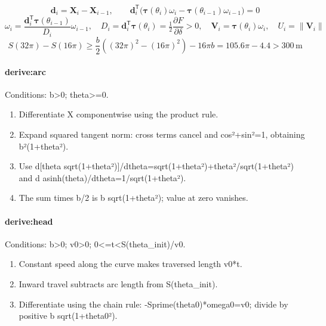 \begin{equation}
\mathbf d_i=\mathbf X_i-\mathbf X_{i-1},\qquad \mathbf d_i^{\mathsf T}\bigl(\boldsymbol\tau(\theta_i)\omega_i-\boldsymbol\tau(\theta_{i-1})\omega_{i-1}\bigr)=0
\label{eq:velocity-constraint}
\end{equation}
\begin{equation}
\boxed{\omega_i=\frac{\mathbf d_i^{\mathsf T}\boldsymbol\tau(\theta_{i-1})}{D_i}\omega_{i-1}},\quad D_i=\mathbf d_i^{\mathsf T}\boldsymbol\tau(\theta_i)=\tfrac12\frac{\partial F}{\partial\delta}>0,\quad \mathbf V_i=\boldsymbol\tau(\theta_i)\omega_i,\quad U_i=\|\mathbf V_i\|
\label{eq:velocity}
\end{equation}
\begin{equation}
S(32\pi)-S(16\pi)\ge\frac b2\left((32\pi)^2-(16\pi)^2\right)-16\pi b=105.6\pi-4.4>300\,\mathrm m
\label{eq:radius-bound}
\end{equation}
\paragraph{derive:arc}
Conditions: b>0; theta>=0.
\begin{enumerate}
\item Differentiate X componentwise using the product rule.
\item Expand squared tangent norm: cross terms cancel and cos²+sin²=1, obtaining b²(1+theta²).
\item Use d[theta sqrt(1+theta²)]/dtheta=sqrt(1+theta²)+theta²/sqrt(1+theta²) and d asinh(theta)/dtheta=1/sqrt(1+theta²).
\item The sum times b/2 is b sqrt(1+theta²); value at zero vanishes.
\end{enumerate}
\paragraph{derive:head}
Conditions: b>0; v0>0; 0<=t<S(theta\_init)/v0.
\begin{enumerate}
\item Constant speed along the curve makes traversed length v0*t.
\item Inward travel subtracts arc length from S(theta\_init).
\item Differentiate using the chain rule: -Sprime(theta0)*omega0=v0; divide by positive b sqrt(1+theta0²).
\end{enumerate}
